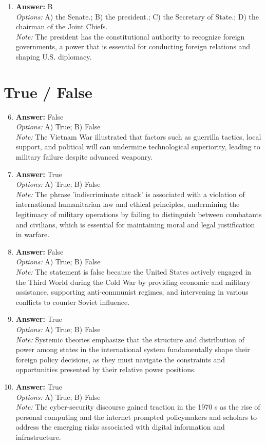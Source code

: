 \documentclass[12pt]{article}
\begin{document}
\begin{enumerate}[label=\arabic*.]
\item \textbf{Answer:} B
\\ \textit{Options:} A) the Senate.; B) the president.; C) the Secretary of State.; D) the chairman of the Joint Chiefs.
\\ \textit{Note:} The president has the constitutional authority to recognize foreign governments, a power that is essential for conducting foreign relations and shaping U.S. diplomacy.
\end{enumerate}

\section*{True / False}
\begin{enumerate}[label=\arabic*.]
\setcounter{enumi}{5}
\item \textbf{Answer:} False
\\ \textit{Options:} A) True; B) False
\\ \textit{Note:} The Vietnam War illustrated that factors such as guerrilla tactics, local support, and political will can undermine technological superiority, leading to military failure despite advanced weaponry.
\item \textbf{Answer:} True
\\ \textit{Options:} A) True; B) False
\\ \textit{Note:} The phrase 'indiscriminate attack' is associated with a violation of international humanitarian law and ethical principles, undermining the legitimacy of military operations by failing to distinguish between combatants and civilians, which is essential for maintaining moral and legal justification in warfare.
\item \textbf{Answer:} False
\\ \textit{Options:} A) True; B) False
\\ \textit{Note:} The statement is false because the United States actively engaged in the Third World during the Cold War by providing economic and military assistance, supporting anti-communist regimes, and intervening in various conflicts to counter Soviet influence.
\item \textbf{Answer:} True
\\ \textit{Options:} A) True; B) False
\\ \textit{Note:} Systemic theories emphasize that the structure and distribution of power among states in the international system fundamentally shape their foreign policy decisions, as they must navigate the constraints and opportunities presented by their relative power positions.
\item \textbf{Answer:} True
\\ \textit{Options:} A) True; B) False
\\ \textit{Note:} The cyber-security discourse gained traction in the 1970 s as the rise of personal computing and the internet prompted policymakers and scholars to address the emerging risks associated with digital information and infrastructure.
\end{enumerate}
\end{document}
